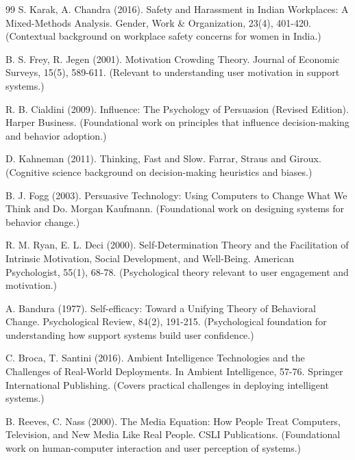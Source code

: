 \documentclass[oneside,a4paper,12pt]{report}
\begin{document}
\begin{thebibliography}{99}
 S. Karak, A. Chandra (2016). Safety and Harassment in Indian Workplaces: A Mixed-Methods Analysis. Gender, Work \& Organization, 23(4), 401-420. (Contextual background on workplace safety concerns for women in India.)
\vspace{2mm}

 B. S. Frey, R. Jegen (2001). Motivation Crowding Theory. Journal of Economic Surveys, 15(5), 589-611. (Relevant to understanding user motivation in support systems.)
\vspace{2mm}

 R. B. Cialdini (2009). Influence: The Psychology of Persuasion (Revised Edition). Harper Business. (Foundational work on principles that influence decision-making and behavior adoption.)
\vspace{2mm}

 D. Kahneman (2011). Thinking, Fast and Slow. Farrar, Straus and Giroux. (Cognitive science background on decision-making heuristics and biases.)
\vspace{2mm}

 B. J. Fogg (2003). Persuasive Technology: Using Computers to Change What We Think and Do. Morgan Kaufmann. (Foundational work on designing systems for behavior change.)
\vspace{2mm}

 R. M. Ryan, E. L. Deci (2000). Self-Determination Theory and the Facilitation of Intrinsic Motivation, Social Development, and Well-Being. American Psychologist, 55(1), 68-78. (Psychological theory relevant to user engagement and motivation.)
\vspace{2mm}

 A. Bandura (1977). Self-efficacy: Toward a Unifying Theory of Behavioral Change. Psychological Review, 84(2), 191-215. (Psychological foundation for understanding how support systems build user confidence.)
\vspace{2mm}

 C. Broca, T. Santini (2016). Ambient Intelligence Technologies and the Challenges of Real-World Deployments. In Ambient Intelligence, 57-76. Springer International Publishing. (Covers practical challenges in deploying intelligent systems.)
\vspace{2mm}

 B. Reeves, C. Nass (2000). The Media Equation: How People Treat Computers, Television, and New Media Like Real People. CSLI Publications. (Foundational work on human-computer interaction and user perception of systems.)
\vspace{2mm}


\end{thebibliography}
\end{document}
